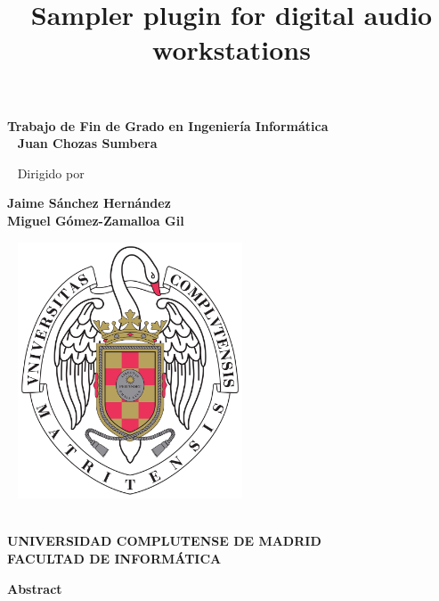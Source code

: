 \documentclass[12pt, a4paper, hidelinks]{article}
\title{\textbf{Sampler plugin for digital audio workstations}}
\date{\vspace{-10ex}}
\begin{document}
	\maketitle
	\begin{center}
		\textbf{Trabajo de Fin de Grado en Ingeniería Informática}\\
		
		~\newline
		\textbf{\large{Juan Chozas Sumbera}}
		
		~\newline
		Dirigido por
		
		\textbf{Jaime Sánchez Hernández\\
		Miguel Gómez-Zamalloa Gil}
		
		
		~\newline
		\includegraphics[width=0.5\textwidth]{logo_UCM.png}\\
		~\newline
		
		\textbf{\large{UNIVERSIDAD COMPLUTENSE DE MADRID}}\\
		
		\textbf{FACULTAD DE INFORMÁTICA}
	\end{center}

	
	
	\newpage

	
	\newpage
	\huge
	\textbf{Abstract}\\
\end{document}

